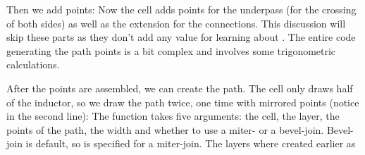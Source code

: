 Then we add points:
Now the cell adds points for the underpass (for the crossing of both sides) as well as the extension for the connections.
This discussion will skip these parts as they don't add any value for learning about .
The entire code generating the path points is a bit complex and involves some trigonometric calculations.

After the points are assembled, we can create the path. The cell only draws half of the inductor, so we draw the path twice, one time with mirrored points (notice
 in the second line):
The  function takes five arguments: the cell, the layer, the points of the path, the width and whether to use a miter- or a bevel-join. Bevel-join is
default, so  is specified for a miter-join.
The layers where created earlier as

